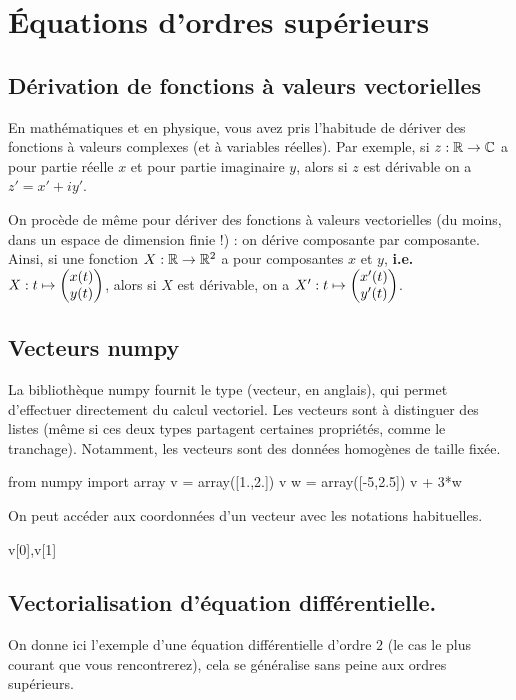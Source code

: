 \section{Équations d'ordres supérieurs}

\subsection{Dérivation de fonctions à valeurs vectorielles}

En mathématiques et en physique, vous avez pris l'habitude de dériver des fonctions à valeurs complexes (et à variables réelles). 
Par exemple, si $z : \mathbb{R}\to\mathbb{C}$ a pour partie réelle $x$ et pour partie imaginaire $y$, alors si $z$ est dérivable on a 
$    z' = x' + iy'$.

On procède de même pour dériver des fonctions à valeurs vectorielles (du moins, dans un espace de dimension finie !) : on dérive composante par composante. 
Ainsi, si une fonction $X : \mathbb{R}\to\mathbb{R}^2$ a pour composantes $x$ et $y$, \textbf{i.e.} 
$    X : t \mapsto \begin{pmatrix} x(t) \\ y(t) \end{pmatrix}$, 
alors si $X$ est dérivable, on a $    X' : t \mapsto \begin{pmatrix} x'(t) \\ y'(t) \end{pmatrix}$.


\subsection{Vecteurs numpy}

La bibliothèque numpy fournit le type  (vecteur, en anglais), qui permet d'effectuer directement du calcul vectoriel. 
Les vecteurs sont à distinguer des listes (même si ces deux types partagent certaines propriétés, comme le tranchage). Notamment, les vecteurs sont des données homogènes de taille fixée. 

\begin{pyconsole}
from numpy import array
v = array([1.,2.])
v
w = array([-5,2.5])
v + 3*w
\end{pyconsole}
On peut accéder aux coordonnées d'un vecteur avec les notations habituelles. 
\begin{pyconsole}
v[0],v[1]
\end{pyconsole}

\subsection{Vectorialisation d'équation différentielle.}

On donne ici l'exemple d'une équation différentielle d'ordre $2$ (le cas le plus courant que vous rencontrerez), cela se généralise sans peine aux ordres supérieurs. 

